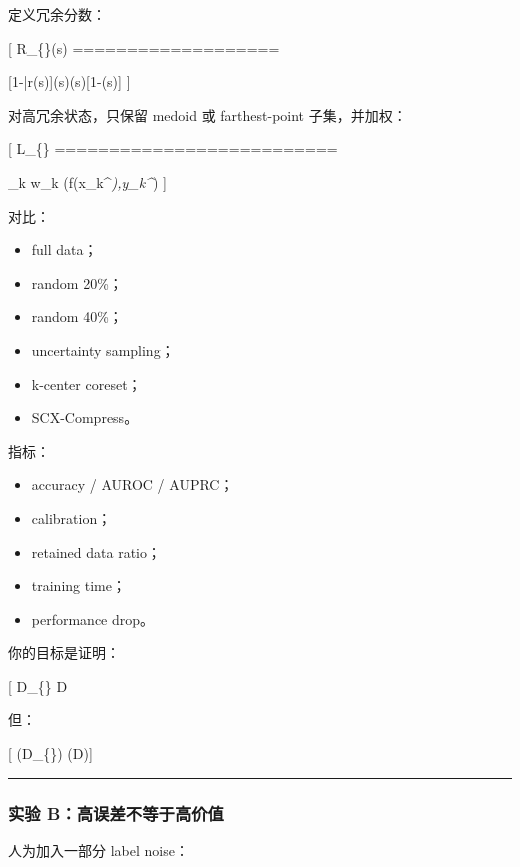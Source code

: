 \documentclass[
  12pt,
]{ctexart}
\providecommand{\tightlist}{%
  \setlength{\itemsep}{0pt}\setlength{\parskip}{0pt}}
\begin{document}
定义冗余分数：

{[} R\_\{\}(s) ===================

{[}1-\bar r(s){]}\rho(s)(s){[}1-(s){]} {]}

对高冗余状态，只保留 medoid 或 farthest-point 子集，并加权：

{[} \mathcal L\_\{\} ==========================

\sum\_k w\_k \ell(f(x\_k\^{}\emph{),y\_k\^{}}) {]}

对比：

\begin{itemize}
\tightlist
\item
  full data；
\item
  random 20\%；
\item
  random 40\%；
\item
  uncertainty sampling；
\item
  k-center coreset；
\item
  SCX-Compress。
\end{itemize}

指标：

\begin{itemize}
\tightlist
\item
  accuracy / AUROC / AUPRC；
\item
  calibration；
\item
  retained data ratio；
\item
  training time；
\item
  performance drop。
\end{itemize}

你的目标是证明：

{[} \textbar{}\mathcal D\_\{\}\textbar{}
\ll \textbar{}\mathcal D\textbar{]}

但：

{[} (\mathcal D\_\{\}) \approx
{}(\mathcal D){]}

\begin{center}\rule{0.5\linewidth}{0.5pt}\end{center}

\subsubsection{实验
B：高误差不等于高价值}\label{ux5b9eux9a8c-bux9ad8ux8befux5deeux4e0dux7b49ux4e8eux9ad8ux4ef7ux503c}

人为加入一部分 label noise：
\end{document}
